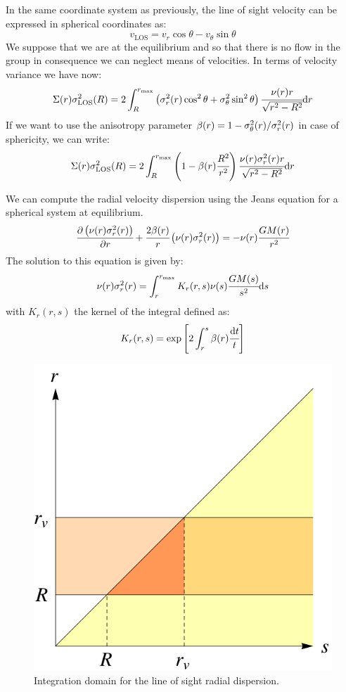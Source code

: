In the same coordinate system as previously, the line of sight velocity can be
expressed in spherical coordinates as:
%
\begin{equation}
    v_{\mathrm{LOS}} = v_r \cos\theta - v_\theta \sin\theta
\end{equation}
%
We suppose that we are at the equilibrium and so that there is no flow in the
group in consequence we can neglect means of velocities. In terms of velocity
variance we have now:
%
\begin{equation}
    \Sigma(r)\sigma_{\mathrm{LOS}}^2(R) = 2\int_R^{r_{\max}}
    \left({\sigma_r^2(r)\cos^2\theta+\sigma_\theta^2\sin^2\theta}\right)
    \cfrac{\nu{(r)}{r}}{\sqrt{r^2-R^2}}{\rm{d}}{r}
\end{equation}
%
If we want to use the anisotropy parameter
$\beta(r)=1-\sigma_\theta^2(r)/\sigma_r^2(r)$ in case of sphericity, we can write:
%
\begin{equation}
    \Sigma(r)\sigma_{\mathrm{LOS}}^2(R) = 2\int_R^{r_{\max}}
    \left({1-\beta(r)\cfrac{R^2}{r^2}}\right)
    \cfrac{\nu{(r)}{\sigma_r^2(r)}{r}}{\sqrt{r^2-R^2}}{\rm{d}}{r}
\end{equation}

We can compute the radial velocity dispersion using the Jeans equation for a
spherical system at equilibrium.
%
\begin{equation}
    \cfrac{{\partial} \left(\nu(r)\sigma_r^2(r)\right)}{{\partial} r} + \cfrac{2\beta(r)}{r}\left(\nu(r)\sigma_r^2(r)\right)=
    -\nu(r)\cfrac{GM(r)}{r^2}
\end{equation}
%
The solution to this equation is given by:
%
\begin{equation}
    \nu(r)\sigma_r^2(r)=\int_r^{r_{\max}}K_r(r,s)\nu(s)\cfrac{GM(s)}{s^2}{\rm{d}}{s}
\end{equation}
%
with $K_r(r,s)$ the kernel of the integral defined as:
%
\begin{equation}
    K_r(r,s)=\exp\left[2\int_r^s\beta(r)\cfrac{{\rm{d}}{t}}{t}\right]
\end{equation}
%
\begin{figure}[H]
    \centering
    \includegraphics[width=0.5\linewidth]{figures/los_variance/domint}
    \caption{Integration domain for the line of sight radial
    dispersion.\label{fig:domint}}
\end{figure}
%
